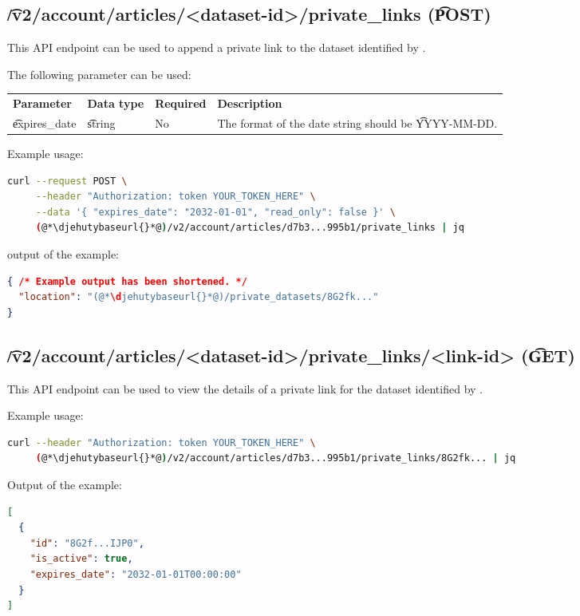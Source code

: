 \subsection{\t{/v2/account/articles/<dataset-id>/private\_links} (\t{POST})}

  This API endpoint can be used to append a private link to the dataset
  identified by .

  The following parameter can be used:

\begin{tabularx}{\textwidth}{*{3}{!{\VRule[-1pt]}l}!{\VRule[-1pt]}X}
  \headrow
  \textbf{Parameter} & \textbf{Data type} & \textbf{Required} & \textbf{Description}\\
  \t{expires\_date}  & \t{string}         & No                & The format of the date string
                                                                should be \t{YYYY-MM-DD}.
\end{tabularx}

  Example usage:
\begin{lstlisting}[language=bash]
curl --request POST \
     --header "Authorization: token YOUR_TOKEN_HERE" \
     --data '{ "expires_date": "2032-01-01", "read_only": false }' \
     (@*\djehutybaseurl{}*@)/v2/account/articles/d7b3...995b1/private_links | jq
\end{lstlisting}

  output of the example:
\begin{lstlisting}[language=JSON]
{ /* Example output has been shortened. */
  "location": "(@*\djehutybaseurl{}*@)/private_datasets/8G2fk..."
}
\end{lstlisting}

\subsection{\t{/v2/account/articles/<dataset-id>/private\_links/<link-id>} (\t{GET})}

  This API endpoint can be used to view the details of a private link for
  the dataset identified by \code{dataset-id}.

  Example usage:
\begin{lstlisting}[language=bash]
curl --header "Authorization: token YOUR_TOKEN_HERE" \
     (@*\djehutybaseurl{}*@)/v2/account/articles/d7b3...995b1/private_links/8G2fk... | jq
\end{lstlisting}

  Output of the example:
\begin{lstlisting}[language=JSON]
[
  {
    "id": "8G2f...IJP0",
    "is_active": true,
    "expires_date": "2032-01-01T00:00:00"
  }
]
\end{lstlisting}

